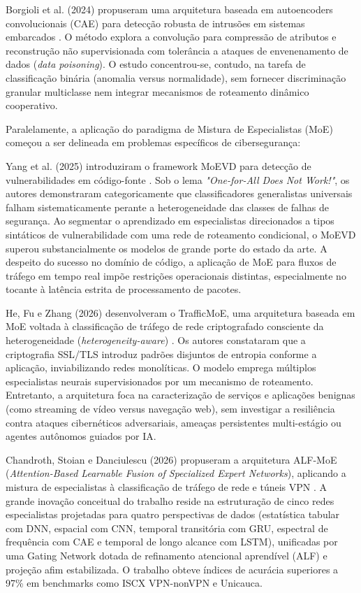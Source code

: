 Borgioli et al. (2024) propuseram uma arquitetura baseada em autoencoders convolucionais (CAE) para detecção robusta de intrusões em sistemas embarcados \cite{borgioli2024cae}. O método explora a convolução para compressão de atributos e reconstrução não supervisionada com tolerância a ataques de envenenamento de dados (\emph{data poisoning}). O estudo concentrou-se, contudo, na tarefa de classificação binária (anomalia versus normalidade), sem fornecer discriminação granular multiclasse nem integrar mecanismos de roteamento dinâmico cooperativo.

Paralelamente, a aplicação do paradigma de Mistura de Especialistas (MoE) começou a ser delineada em problemas específicos de cibersegurança:

Yang et al. (2025) introduziram o framework MoEVD para detecção de vulnerabilidades em código-fonte \cite{moevd2025}. Sob o lema \emph{"One-for-All Does Not Work!"}, os autores demonstraram categoricamente que classificadores generalistas universais falham sistematicamente perante a heterogeneidade das classes de falhas de segurança. Ao segmentar o aprendizado em especialistas direcionados a tipos sintáticos de vulnerabilidade com uma rede de roteamento condicional, o MoEVD superou substancialmente os modelos de grande porte do estado da arte. A despeito do sucesso no domínio de código, a aplicação de MoE para fluxos de tráfego em tempo real impõe restrições operacionais distintas, especialmente no tocante à latência estrita de processamento de pacotes.

He, Fu e Zhang (2026) desenvolveram o TrafficMoE, uma arquitetura baseada em MoE voltada à classificação de tráfego de rede criptografado consciente da heterogeneidade (\emph{heterogeneity-aware}) \cite{trafficmoe2026}. Os autores constataram que a criptografia SSL/TLS introduz padrões disjuntos de entropia conforme a aplicação, inviabilizando redes monolíticas. O modelo emprega múltiplos especialistas neurais supervisionados por um mecanismo de roteamento. Entretanto, a arquitetura foca na caracterização de serviços e aplicações benignas (como streaming de vídeo versus navegação web), sem investigar a resiliência contra ataques cibernéticos adversariais, ameaças persistentes multi-estágio ou agentes autônomos guiados por IA.

Chandroth, Stoian e Danciulescu (2026) propuseram a arquitetura ALF-MoE (\emph{Attention-Based Learnable Fusion of Specialized Expert Networks}), aplicando a mistura de especialistas à classificação de tráfego de rede e túneis VPN \cite{alfmoe2026}. A grande inovação conceitual do trabalho reside na estruturação de cinco redes especialistas projetadas para quatro perspectivas de dados (estatística tabular com DNN, espacial com CNN, temporal transitória com GRU, espectral de frequência com CAE e temporal de longo alcance com LSTM), unificadas por uma Gating Network dotada de refinamento atencional aprendível (ALF) e projeção afim estabilizada. O trabalho obteve índices de acurácia superiores a 97\% em benchmarks como ISCX VPN-nonVPN e Unicauca. 

